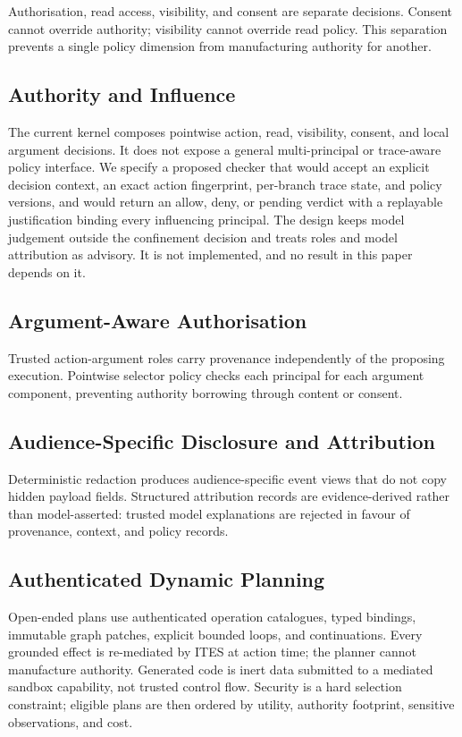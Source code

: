 \documentclass[11pt]{article}
\begin{document}
Authorisation, read access, visibility, and consent are separate decisions.
Consent cannot override authority; visibility cannot override read policy.
This separation prevents a single policy dimension from manufacturing
authority for another.

\subsection{Authority and Influence}

The current kernel composes pointwise action, read, visibility, consent, and
local argument decisions. It does not expose a general multi-principal or
trace-aware policy interface. We specify a proposed checker that would accept
an explicit decision context, an exact action fingerprint, per-branch trace
state, and policy versions, and would return an allow, deny, or pending
verdict with a replayable justification binding every influencing principal.
The design keeps model judgement outside the confinement decision and treats
roles and model attribution as advisory. It is not implemented, and no result
in this paper depends on it.

\subsection{Argument-Aware Authorisation}

Trusted action-argument roles carry provenance independently of the
proposing execution. Pointwise selector policy checks each principal for
each argument component, preventing authority borrowing through content or
consent.

\subsection{Audience-Specific Disclosure and Attribution}

Deterministic redaction produces audience-specific event views that do not
copy hidden payload fields. Structured attribution records are
evidence-derived rather than model-asserted: trusted model explanations are
rejected in favour of provenance, context, and policy records.

\subsection{Authenticated Dynamic Planning}

Open-ended plans use authenticated operation catalogues, typed bindings,
immutable graph patches, explicit bounded loops, and continuations. Every
grounded effect is re-mediated by ITES at action time; the planner cannot
manufacture authority. Generated code is inert data submitted to a mediated
sandbox capability, not trusted control flow. Security is a hard selection
constraint; eligible plans are then ordered by utility, authority
footprint, sensitive observations, and cost.
\end{document}
